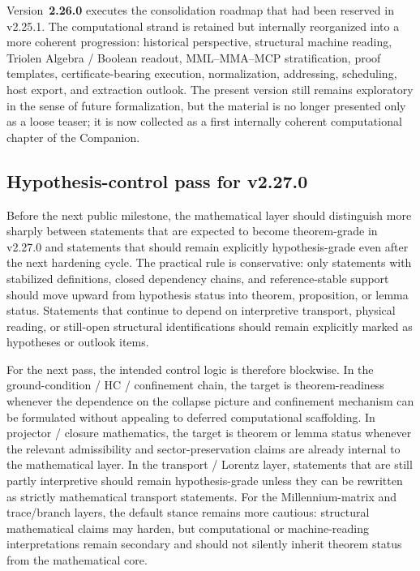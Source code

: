 Version~\textbf{2.26.0} executes the consolidation roadmap that had been reserved in
v2.25.1. The computational strand is retained but internally reorganized into a more
coherent progression: historical perspective, structural machine reading, Triolen
Algebra / Boolean readout, MML--MMA--MCP stratification, proof templates,
certificate-bearing execution, normalization, addressing, scheduling, host export,
and extraction outlook. The present version still remains exploratory in the sense of
future formalization, but the material is no longer presented only as a loose teaser;
it is now collected as a first internally coherent computational chapter of the
Companion.



\subsection*{Hypothesis-control pass for v2.27.0}

Before the next public milestone, the mathematical layer should distinguish more sharply between statements that are expected to become theorem-grade in v2.27.0 and statements that should remain explicitly hypothesis-grade even after the next hardening cycle. The practical rule is conservative: only statements with stabilized definitions, closed dependency chains, and reference-stable support should move upward from hypothesis status into theorem, proposition, or lemma status. Statements that continue to depend on interpretive transport, physical reading, or still-open structural identifications should remain explicitly marked as hypotheses or outlook items.

For the next pass, the intended control logic is therefore blockwise. In the ground-condition / HC / confinement chain, the target is theorem-readiness whenever the dependence on the collapse picture and confinement mechanism can be formulated without appealing to deferred computational scaffolding. In projector / closure mathematics, the target is theorem or lemma status whenever the relevant admissibility and sector-preservation claims are already internal to the mathematical layer. In the transport / Lorentz layer, statements that are still partly interpretive should remain hypothesis-grade unless they can be rewritten as strictly mathematical transport statements. For the Millennium-matrix and trace/branch layers, the default stance remains more cautious: structural mathematical claims may harden, but computational or machine-reading interpretations remain secondary and should not silently inherit theorem status from the mathematical core.

